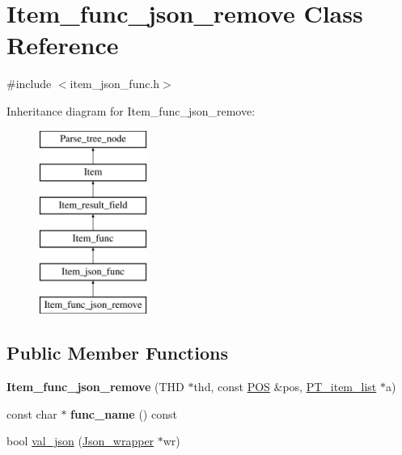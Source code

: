 \hypertarget{classItem__func__json__remove}{}\section{Item\+\_\+func\+\_\+json\+\_\+remove Class Reference}
\label{classItem__func__json__remove}


{\ttfamily \#include $<$item\+\_\+json\+\_\+func.\+h$>$}

Inheritance diagram for Item\+\_\+func\+\_\+json\+\_\+remove\+:\begin{figure}[H]
\begin{center}
\leavevmode
\includegraphics[height=6.000000cm]{classItem__func__json__remove}
\end{center}
\end{figure}
\subsection*{Public Member Functions}
\begin{DoxyCompactItemize}
\item 
\mbox{\label{classItem__func__json__remove_a1af34b8ab60a2fc0c554114198b54f8b}} 
{\bfseries Item\+\_\+func\+\_\+json\+\_\+remove} (T\+HD $\ast$thd, const \mbox{\hyperlink{structYYLTYPE}{P\+OS}} \&pos, \mbox{\hyperlink{classPT__item__list}{P\+T\+\_\+item\+\_\+list}} $\ast$a)
\item 
\mbox{\label{classItem__func__json__remove_ae424e0b146850f398da35daa388d0152}} 
const char $\ast$ {\bfseries func\+\_\+name} () const
\item 
bool \mbox{\hyperlink{classItem__func__json__remove_a54cf17d640b8f52c375b5456341049af}{val\+\_\+json}} (\mbox{\hyperlink{classJson__wrapper}{Json\+\_\+wrapper}} $\ast$wr)
\end{DoxyCompactItemize}
